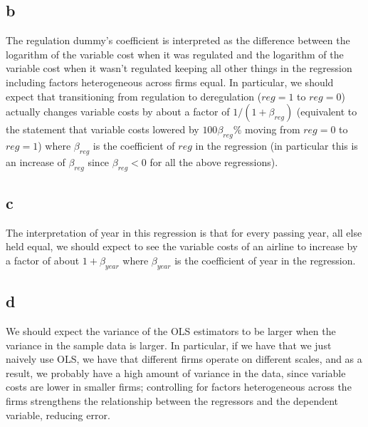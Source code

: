 \documentclass[12pt,letterpaper]{article}
\theoremstyle{definition}
\begin{document}
\subsection*{b}

The regulation dummy's coefficient is interpreted as the difference between the logarithm of the variable cost when it was regulated and the logarithm of the variable cost when it wasn't regulated keeping all other things in the regression including factors heterogeneous across firms equal. In particular, we should expect that transitioning from regulation to deregulation ($reg = 1$ to $reg  = 0$) actually changes variable costs by about a factor of $1/(1 + \beta_{reg})$ (equivalent to the statement that variable costs lowered by $100\beta_{reg}\%$ moving from $reg = 0$ to $reg = 1$) where $\beta_{reg}$ is the coefficient of $reg$ in the regression (in particular this is an increase of $\beta_{reg}$ since $\beta_{reg} < 0$ for all the above regressions).

\subsection*{c}

The interpretation of year in this regression is that for every passing year, all else held equal, we should expect to see the variable costs of an airline to increase by a factor of about $1 + \beta_{year}$ where $\beta_{year}$ is the coefficient of year in the regression.

\subsection*{d}

We should expect the variance of the OLS estimators to be larger when the variance in the sample data is larger. In particular, if we have that we just naively use OLS, we have that different firms operate on different scales, and as a result, we probably have a high amount of variance in the data, since variable costs are lower in smaller firms; controlling for factors heterogeneous across the firms strengthens the relationship between the regressors and the dependent variable, reducing error.
\end{document}
